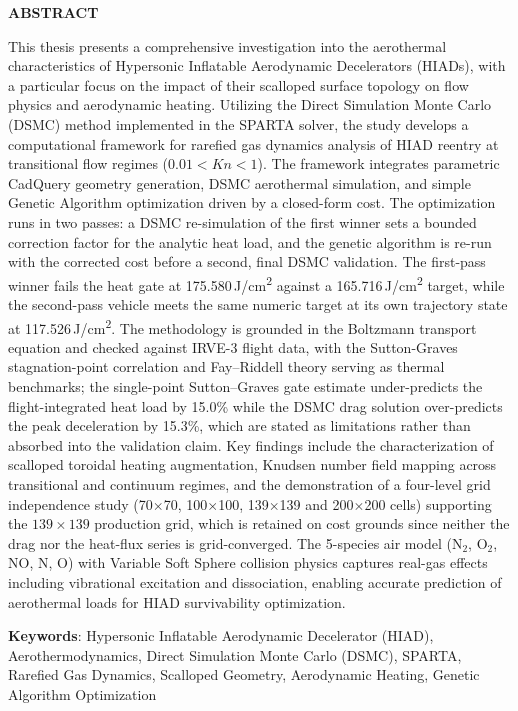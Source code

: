 \clearpage
{}
{}
\begin{center}
\textbf{\large  ABSTRACT}\\[0.5cm]
\end{center}

This thesis presents a comprehensive investigation into the aerothermal characteristics of Hypersonic Inflatable Aerodynamic Decelerators (HIADs), with a particular focus on the impact of their scalloped surface topology on flow physics and aerodynamic heating. Utilizing the Direct Simulation Monte Carlo (DSMC) method implemented in the SPARTA solver, the study develops a computational framework for rarefied gas dynamics analysis of HIAD reentry at transitional flow regimes ($0.01 < Kn < 1$). The framework integrates parametric CadQuery geometry generation, DSMC aerothermal simulation, and simple Genetic Algorithm optimization driven by a closed-form cost. The optimization runs in two passes: a DSMC re-simulation of the first winner sets a bounded correction factor for the analytic heat load, and the genetic algorithm is re-run with the corrected cost before a second, final DSMC validation. The first-pass winner fails the heat gate at 175.580\,J/cm\textsuperscript{2} against a 165.716\,J/cm\textsuperscript{2} target, while the second-pass vehicle meets the same numeric target at its own trajectory state at 117.526\,J/cm\textsuperscript{2}. The methodology is grounded in the Boltzmann transport equation and checked against IRVE-3 flight data, with the Sutton-Graves stagnation-point correlation and Fay--Riddell theory serving as thermal benchmarks; the single-point Sutton--Graves gate estimate under-predicts the flight-integrated heat load by 15.0\% while the DSMC drag solution over-predicts the peak deceleration by 15.3\%, which are stated as limitations rather than absorbed into the validation claim. Key findings include the characterization of scalloped toroidal heating augmentation, Knudsen number field mapping across transitional and continuum regimes, and the demonstration of a four-level grid independence study (70$\times$70, 100$\times$100, 139$\times$139 and 200$\times$200 cells) supporting the $139\times139$ production grid, which is retained on cost grounds since neither the drag nor the heat-flux series is grid-converged. The 5-species air model (N$_2$, O$_2$, NO, N, O) with Variable Soft Sphere collision physics captures real-gas effects including vibrational excitation and dissociation, enabling accurate prediction of aerothermal loads for HIAD survivability optimization.

\noindent \textbf{Keywords}: Hypersonic Inflatable Aerodynamic Decelerator (HIAD), Aerothermodynamics, Direct Simulation Monte Carlo (DSMC), SPARTA, Rarefied Gas Dynamics, Scalloped Geometry, Aerodynamic Heating, Genetic Algorithm Optimization